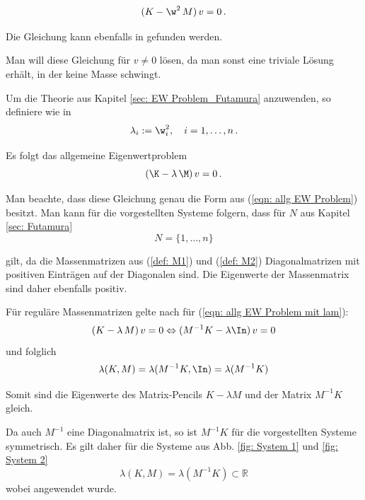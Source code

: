 \documentclass[a4paper,12pt]{report}
\newcommand{\R}{\mathbb R}
\newcommand{\inv}{^{-1}}
\newcommand{\1}{\mathds{1}}
\theoremstyle{plain} %
\theoremstyle{definition} %
\theoremstyle{remark}
\begin{document}
            \begin{equation}
                  \label{eqn: allg EW Problem mit w}
                  (K-\w^2\,M)\,v = 0\,.
            \end{equation}

            Die Gleichung kann ebenfalls in \cite[S. 380]{maschinendynamikDresig} gefunden werden.

            Man will diese Gleichung für $v\ne 0$ lösen, da man sonst eine triviale Lösung erhält, in der keine Masse schwingt.

            Um die Theorie aus Kapitel \ref{sec: EW Problem_Futamura} anzuwenden, so definiere wie in \cite{hauptteilTkachuk}
            $$\lambda_i := \w_i^2,\quad i=1,\dots,n\,.$$

            Es folgt das allgemeine Eigenwertproblem
            \begin{equation}
                  \label{eqn: allg EW Problem mit lam}
                  (\K-\lambda\,\M)\,v = 0\,.
            \end{equation}

            Man beachte, dass diese Gleichung genau die Form aus (\ref{eqn: allg EW Problem}) besitzt.
            Man kann für die vorgestellten Systeme folgern, dass für $N$ aus Kapitel \ref{sec: Futamura}
            $$N=\{1,\dots,n\}$$

            gilt, da die Massenmatrizen aus (\ref{def: M1}) und (\ref{def: M2}) Diagonalmatrizen mit positiven Einträgen auf der Diagonalen sind.
            Die Eigenwerte der Massenmatrix sind daher ebenfalls positiv.

            Für reguläre Massenmatrizen gelte nach \cite[S. 376]{matrixGolub} für (\ref{eqn: allg EW Problem mit lam}):
            $$(K-\lambda\,M)\,v = 0 \Leftrightarrow (M\inv K-\lambda\In)\,v=0$$
            und folglich
            \begin{equation}
                  \label{eqn: Ew Pencil gleich Ew Matrix}
                  \lambda(K, M) =\lambda(M\inv K,\In) = \lambda(M\inv K)
            \end{equation}

            Somit sind die Eigenwerte des Matrix-Pencils $K-\lambda M$ und der Matrix $M\inv K$ gleich.

            Da auch $M\inv$ eine Diagonalmatrix ist, so ist $M\inv K$ für die vorgestellten Systeme symmetrisch.
            Es gilt daher für die Systeme aus Abb. \ref{fig: System 1} und \ref{fig: System 2}
            \begin{equation}
                  \label{eqn: alle Ew reell}
                  \lambda(K, M) = \lambda(M\inv K) \subset \R
            \end{equation}
            wobei \cite[S. 393]{matrixGolub} angewendet wurde.
\end{document}
